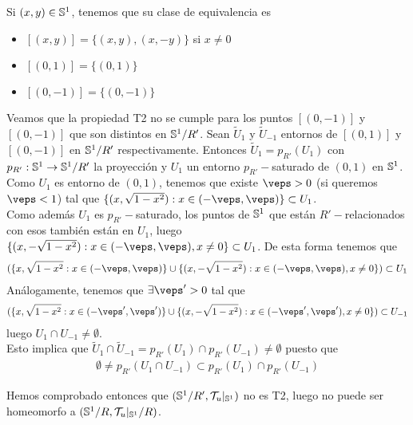 \documentclass[12pt]{article}
\begin{document}
\begin{ejercicio}[4 puntos]
\begin{enumerate}
            Si $(x,y)\in \mathbb{S}^1$, tenemos que su clase de equivalencia es
            \begin{itemize}
                \item $[(x,y)]=\{(x,y),(x,-y)\}$ si $x\neq 0$
                \item $[(0,1)]=\{(0,1)\}$
                \item $[(0,-1)]=\{(0,-1)\}$
            \end{itemize}
            Veamos que la propiedad T2 no se cumple para los puntos $[(0,-1)]$ y $[(0,-1)]$ que son distintos en $\mathbb{S}^1/R'$. Sean $\tilde{U}_1$ y $\tilde{U}_{-1}$ entornos de $[(0,1)]$ y $[(0,-1)]$ en $\mathbb{S}^1/R'$ respectivamente. Entonces $\tilde{U}_1 = p_{R'}(U_1)$ con $p_{R'}:\mathbb{S}^1 \to \mathbb{S}^1/R'$ la proyección y $U_1$ un entorno $p_{R'}-$saturado de $(0,1)$ en $\mathbb{S}^1$. Como $U_1$ es entorno de $(0,1)$, tenemos que existe $\veps >0$ (si queremos $\veps <1$) tal que $\{(x, \sqrt{1-x^2}):x\in (-\veps, \veps)\}\subset U_1$.\\

            Como además $U_1$ es $p_{R'}-$saturado, los puntos de $\mathbb{S}^1$ que están $R'-$relacionados con esos también están en $U_1$, luego $\{(x, -\sqrt{1-x^2}):x\in (-\veps, \veps), x\neq 0\}\subset U_1$. De esta forma tenemos que 
            \begin{gather*}
                (\{x, \sqrt{1-x^2}:x\in (-\veps, \veps)\}\cup \{(x, -\sqrt{1-x^2}) : x\in (-\veps, \veps), x\neq 0\})\subset U_1
            \end{gather*}
            Análogamente, tenemos que $\exists \veps'> 0$ tal que
            \begin{gather*}
                (\{x, \sqrt{1-x^2}:x\in (-\veps', \veps')\}\cup \{(x, -\sqrt{1-x^2}) : x\in (-\veps', \veps'), x\neq 0\})\subset U_{-1}
            \end{gather*}
            luego $U_1\cap U_{-1}\neq \emptyset$.\\

            Esto implica que $\tilde{U}_1\cap \tilde{U}_{-1}=p_{R'}(U_1)\cap p_{R'}(U_{-1})\neq \emptyset$ puesto que
            \begin{gather*}
                \emptyset \neq p_{R'}(U_1 \cap U_{-1})\subset p_{R'}(U_1)\cap p_{R'}(U_{-1})
            \end{gather*}

            Hemos comprobado entonces que $(\mathbb{S}^1/R', \mathcal{T}_u|_{\mathbb{S}^1})$ no es T2, luego no puede ser homeomorfo a $(\mathbb{S}^1/R, \mathcal{T}_u|_{\mathbb{S}^1}/R)$.
        \end{enumerate}
    \end{ejercicio}
\end{document}
